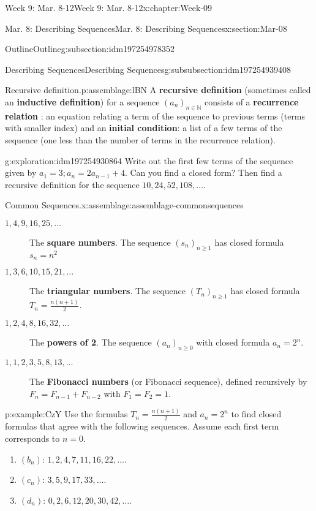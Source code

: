 \documentclass[oneside,10pt,]{book}
\newcommand{\terminology}[1]{\textbf{#1}}
\numberwithin{equation}{section}
\renewcommand{\ge}{\geqslant}
\def\N{{\mathbb N}}
\newcommand{\N}{\mathbb N}
\begin{document}
\begin{chapterptx}{Week 9: Mar. 8-12}{}{Week 9: Mar. 8-12}{}{}{x:chapter:Week-09}
\begin{sectionptx}{Mar. 8: Describing Sequences}{}{Mar. 8: Describing Sequences}{}{}{x:section:Mar-08}
\begin{subsectionptx}{Outline}{}{Outline}{}{}{g:subsection:idm197254978352}
\begin{subsubsectionptx}{Describing Sequences}{}{Describing Sequences}{}{}{g:subsubsection:idm197254939408}
\begin{assemblage}{Recursive definition.}{p:assemblage:lBN}
A \terminology{recursive definition}  (sometimes called an \terminology{inductive definition}) for a sequence \((a_n)_{n\in\N}\) consists of a \terminology{recurrence relation}  : an equation relating a term of the sequence to previous terms (terms with smaller index) and an \terminology{initial condition}:  a list of a few terms of the sequence (one less than the number of terms in the recurrence relation).%
\end{assemblage}
\begin{exploration}{}{g:exploration:idm197254930864}%
Write out the first few terms of the sequence given by \(a_1 = 3; a_n = 2 a_{n-1}+4\). Can you find a closed form? Then find a recursive definition for the sequence \(10, 24, 52, 108, \ldots\).%
\end{exploration}%
\begin{assemblage}{Common Sequences.}{x:assemblage:assemblage-commonsequences}%
%
\begin{description}
\item[{\(1, 4, 9, 16, 25, \ldots\)}]The \terminology{square numbers}.  The sequence \((s_n)_{n \ge 1}\) has closed formula \(s_n = n^2\)%
\item[{\(1, 3, 6, 10, 15, 21, \ldots\)}]The \terminology{triangular numbers}.  The sequence \((T_n)_{n \ge 1}\) has closed formula \(T_n = \frac{n(n+1)}{2}\).%
\label{g:notation:idm197254912720}\item[{\(1, 2, 4, 8, 16, 32,\ldots\)}]The \terminology{powers of 2}.  The sequence \((a_n)_{n \ge 0}\) with closed formula \(a_n = 2^n\).%
\item[{\(1, 1, 2, 3, 5, 8, 13, \ldots\)}]The \terminology{Fibonacci numbers} (or Fibonacci sequence), defined recursively by \(F_n = F_{n-1} + F_{n-2}\) with \(F_1 = F_2 = 1\).%
\end{description}
%
\end{assemblage}
\begin{example}{}{p:example:CzY}%
Use the formulas \(T_n = \frac{n(n+1)}{2}\) and \(a_n = 2^n\) to find closed formulas that agree with the following sequences.  Assume each first term corresponds to \(n=0\).%
\begin{enumerate}
\item{}\((b_n)\): \(1, 2, 4, 7, 11, 16, 22, \ldots \).%
\item{}\((c_n)\): \(3, 5, 9, 17, 33,\ldots \).%
\item{}\((d_n)\): \(0, 2, 6, 12, 20, 30, 42,\ldots \).%

\end{enumerate}
\end{example}
\end{subsubsectionptx}
\end{subsectionptx}
\end{sectionptx}
\end{chapterptx}
\end{document}
